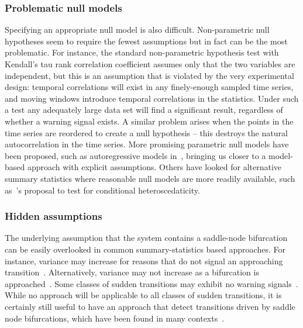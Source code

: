 \documentclass[authoryear,review,11pt]{elsarticle}
\begin{document}
\subsubsection*{Problematic null models}
Specifying an appropriate null model is also difficult.  
Non-parametric null hypotheses seem to require the fewest assumptions but in fact can be the most problematic.  
For instance, the standard non-parametric hypothesis test with Kendall's tau rank correlation coefficient
assumes only that the two variables are independent,
but this is an assumption that is violated by the very experimental design:
temporal correlations will exist in any finely-enough sampled time series, 
and moving windows introduce temporal correlations in the statistics.
Under such a test any adequately large data set will find a significant result,
regardless of whether a warning signal exists.
A similar problem arises when the points in the time series are reordered to create a null hypothesis -- 
this destroys the natural autocorrelation in the time series.  
More promising parametric null models have been proposed, 
such as autoregressive models in~\citet{Dakos2008}, bringing us  
closer to a model-based approach with explicit assumptions.  
Others have looked for alternative summary statistics where 
reasonable null models are more readily available, 
such as~\citet{Seekell2011}'s proposal to test for conditional heteroscedaticity.

\subsubsection*{Hidden assumptions}
The underlying assumption that the system contains a saddle-node bifurcation
can be easily overlooked in common summary-statistics based approaches.  
For instance, variance may increase for reasons that 
do not signal an approaching transition~\citep{Schreiber2003, Schreiber2008}.
Alternatively, variance may not increase as a bifurcation is approached~\citep{Livina2012, Dakos2011a}.
Some classes of sudden transitions may exhibit no warning signals~\cite{Hastings2010}.   
While no approach will be applicable to all classes of sudden transitions,
it is certainly still useful to have an approach that detect transitions driven by 
saddle node bifurcations, which have been found in many contexts~\citep[\emph{e.g.}, see][]{Scheffer2001}.  
\end{document}
